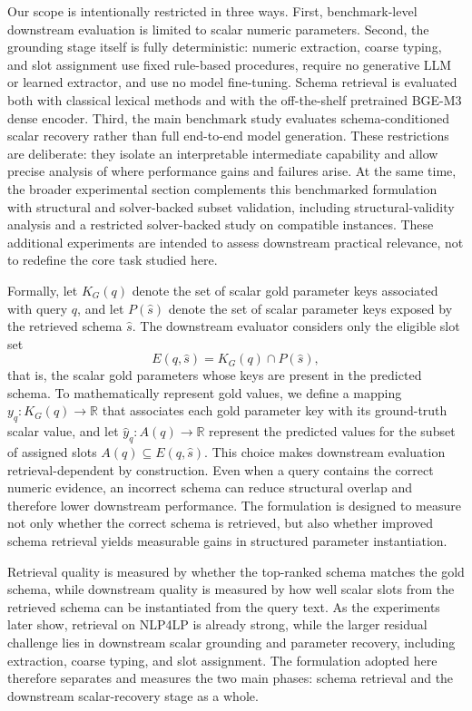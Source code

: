 \documentclass[3p]{elsarticle}
\begin{document}
Our scope is intentionally restricted in three ways. First, benchmark-level downstream evaluation is limited to scalar numeric parameters. Second, the grounding stage itself is fully deterministic: numeric extraction, coarse typing, and slot assignment use fixed rule-based procedures, require no generative LLM or learned extractor, and use no model fine-tuning. Schema retrieval is evaluated both with classical lexical methods and with the off-the-shelf pretrained BGE-M3 dense encoder. Third, the main benchmark study evaluates schema-conditioned scalar recovery rather than full end-to-end model generation. These restrictions are deliberate: they isolate an interpretable intermediate capability and allow precise analysis of where performance gains and failures arise. At the same time, the broader experimental section complements this benchmarked formulation with structural and solver-backed subset validation, including structural-validity analysis and a restricted solver-backed study on compatible instances. These additional experiments are intended to assess downstream practical relevance, not to redefine the core task studied here.

Formally, let $K_G(q)$ denote the set of scalar gold parameter keys associated with query $q$, and let $P(\hat{s})$ denote the set of scalar parameter keys exposed by the retrieved schema $\hat{s}$. The downstream evaluator considers only the eligible slot set
\begin{equation}
E(q,\hat{s}) = K_G(q) \cap P(\hat{s}),
\label{eq:eligible_slots}
\end{equation}
that is, the scalar gold parameters whose keys are present in the predicted schema. To mathematically represent gold values, we define a mapping $y_q : K_G(q) \to \mathbb{R}$ that associates each gold parameter key with its ground-truth scalar value, and let $\hat{y}_{q} : A(q) \to \mathbb{R}$ represent the predicted values for the subset of assigned slots $A(q) \subseteq E(q, \hat{s})$. This choice makes downstream evaluation retrieval-dependent by construction. Even when a query contains the correct numeric evidence, an incorrect schema can reduce structural overlap and therefore lower downstream performance. The formulation is designed to measure not only whether the correct schema is retrieved, but also whether improved schema retrieval yields measurable gains in structured parameter instantiation.

Retrieval quality is measured by whether the top-ranked schema matches the gold schema, while downstream quality is measured by how well scalar slots from the retrieved schema can be instantiated from the query text. As the experiments later show, retrieval on \textsc{NLP4LP} is already strong, while the larger residual challenge lies in downstream scalar grounding and parameter recovery, including extraction, coarse typing, and slot assignment. The formulation adopted here therefore separates and measures the two main phases: schema retrieval and the downstream scalar-recovery stage as a whole.
\end{document}

